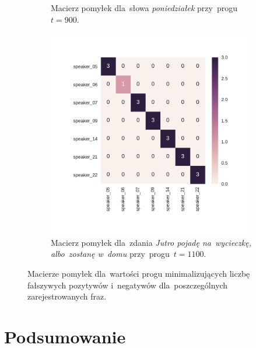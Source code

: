 \documentclass[11pt,a4paper]{article}
\begin{document}
\begin{figure}
\begin{subfigure}[t]{0.45\textwidth}
        \caption{Macierz pomyłek dla~słowa \emph{poniedziałek} przy~progu~$t = 900$.}
    \end{subfigure}
    \qquad
    \begin{subfigure}[t]{0.45\textwidth}
        \includegraphics[width=\textwidth]{res/plots/confusion_matrix_wycieczka.pdf}
        \caption{Macierz pomyłek dla~zdania \emph{Jutro pojadę na~wycieczkę, albo~zostanę w~domu} przy~progu~$t = 1100$.}
    \end{subfigure}
    \caption{Macierze pomyłek dla~wartości progu minimalizujących liczbę fałszywych pozytywów i~negatywów dla~poszczególnych zarejestrowanych fraz.}
    \label{fig:confusion-matrices}
\end{figure}

\section{Podsumowanie}
\end{document}
